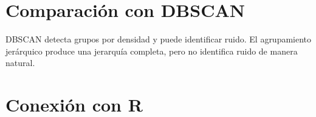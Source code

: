 \documentclass[
  spanish,
  10.5pt,
  letterpaper,
  DIV=11,
  numbers=noendperiod,
  oneside,
  open=any]{scrreprt}
\theoremstyle{definition}
\theoremstyle{definition}
\theoremstyle{plain}
\theoremstyle{remark}
\begin{document}
\section*{Comparación con DBSCAN}\label{comparaciuxf3n-con-dbscan}


DBSCAN detecta grupos por densidad y puede identificar ruido. El
agrupamiento jerárquico produce una jerarquía completa, pero no
identifica ruido de manera natural.

\section*{Conexión con R}\label{conexiuxf3n-con-r-17}

\end{document}
